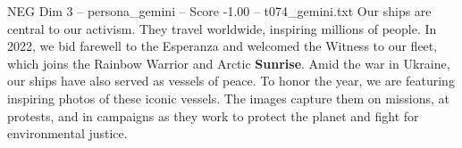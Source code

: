 \begin{textsample}{NEG Dim 3 – persona\_gemini – Score -1.00 – t074\_gemini.txt}  \label{ex:f3_neg_005}
Our ships are central to our activism.
They travel worldwide, inspiring millions of people.
In 2022, we bid farewell to the Esperanza and welcomed the Witness to our fleet, which joins the Rainbow Warrior and Arctic \textbf{Sunrise}.
Amid the war in Ukraine, our ships have also served as vessels of peace.
To honor the year, we are featuring inspiring photos of these iconic vessels.
The images capture them on missions, at protests, and in campaigns as they work to protect the planet and fight for environmental justice.

\end{textsample}

